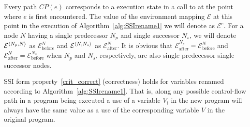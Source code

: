 Every path $CP(e)$ corresponds to a execution state in a call to
 at the point where $e$ is first encountered.  The value
of the environment mapping $\mathcal{E}$ at this point in the
execution of Algorithm~\ref{alg:SSIrename1} we will denote as
$\mathcal{E}^e$.  For a node $N$ having a single predecessor $N_p$ and
single successor $N_s$, we will denote
$\mathcal{E}^{\left\langle N_p,N \right\rangle}$ as $\mathcal{E}_{\text{before}}^N$ and 
$\mathcal{E}^{\left\langle N,N_s \right\rangle}$ as $\mathcal{E}_{\text{after}}^N$.
It is obvious that 
$\mathcal{E}_{\text{after}}^{N_p} = \mathcal{E}_{\text{before}}^{N  }$ and
$\mathcal{E}_{\text{after}}^{N  } = \mathcal{E}_{\text{before}}^{N_s}$
when $N_p$ and $N_s$, respectively, are also single-predecessor
single-successor nodes.

\begin{lemma}\label{lem:correctness}
SSI form property~\ref{crit_correct} (correctness) holds for
variables renamed according to Algorithm~\ref{alg:SSIrename1}.  That
is, along any possible control-flow path in a program being executed a
use of a variable $V_i$ in the new program will always have the same
value as a use of the corresponding variable $V$ in the original
program.
\end{lemma}

